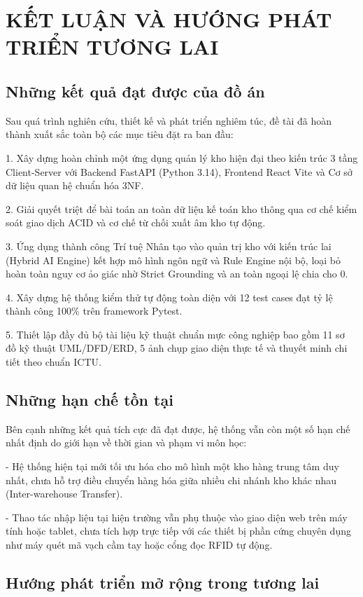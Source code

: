 \chapter{KẾT LUẬN VÀ HƯỚNG PHÁT TRIỂN TƯƠNG LAI}

\section{Những kết quả đạt được của đồ án}

Sau quá trình nghiên cứu, thiết kế và phát triển nghiêm túc, đề tài đã hoàn thành xuất sắc toàn bộ các mục tiêu đặt ra ban đầu:

1. Xây dựng hoàn chỉnh một ứng dụng quản lý kho hiện đại theo kiến trúc 3 tầng Client-Server với Backend FastAPI (Python 3.14), Frontend React Vite và Cơ sở dữ liệu quan hệ chuẩn hóa 3NF.

2. Giải quyết triệt để bài toán an toàn dữ liệu kế toán kho thông qua cơ chế kiểm soát giao dịch ACID và cơ chế từ chối xuất âm kho tự động.

3. Ứng dụng thành công Trí tuệ Nhân tạo vào quản trị kho với kiến trúc lai (Hybrid AI Engine) kết hợp mô hình ngôn ngữ và Rule Engine nội bộ, loại bỏ hoàn toàn nguy cơ ảo giác nhờ Strict Grounding và an toàn ngoại lệ chia cho 0.

4. Xây dựng hệ thống kiểm thử tự động toàn diện với 12 test cases đạt tỷ lệ thành công 100\% trên framework Pytest.

5. Thiết lập đầy đủ bộ tài liệu kỹ thuật chuẩn mực công nghiệp bao gồm 11 sơ đồ kỹ thuật UML/DFD/ERD, 5 ảnh chụp giao diện thực tế và thuyết minh chi tiết theo chuẩn ICTU.

\section{Những hạn chế tồn tại}

Bên cạnh những kết quả tích cực đã đạt được, hệ thống vẫn còn một số hạn chế nhất định do giới hạn về thời gian và phạm vi môn học:

- Hệ thống hiện tại mới tối ưu hóa cho mô hình một kho hàng trung tâm duy nhất, chưa hỗ trợ điều chuyển hàng hóa giữa nhiều chi nhánh kho khác nhau (Inter-warehouse Transfer).

- Thao tác nhập liệu tại hiện trường vẫn phụ thuộc vào giao diện web trên máy tính hoặc tablet, chưa tích hợp trực tiếp với các thiết bị phần cứng chuyên dụng như máy quét mã vạch cầm tay hoặc cổng đọc RFID tự động.

\section{Hướng phát triển mở rộng trong tương lai}

